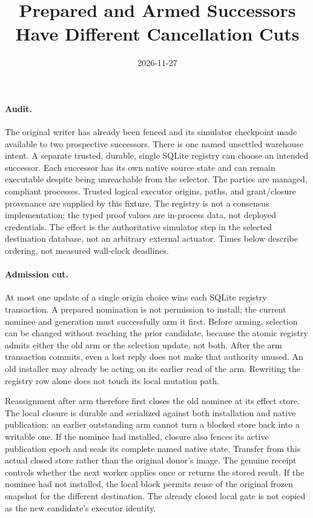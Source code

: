 \documentclass[11pt]{article}
\title{Prepared and Armed Successors Have Different Cancellation Cuts}
\date{2026-11-27}
\begin{document}
\maketitle

\paragraph{Audit.}
The original writer has already been fenced and its simulator
checkpoint made available to two prospective successors.
There is one named unsettled warehouse intent. A separate trusted,
durable, single SQLite registry can choose an intended successor.
Each successor has its own native source state and can remain
executable despite being unreachable from the selector. The parties
are managed, compliant processes. Trusted logical executor origins,
paths, and grant/closure provenance are supplied by this fixture.
The registry is not a consensus implementation; the typed proof
values are in-process data, not deployed credentials. The effect is
the authoritative simulator step in the selected destination
database, not an arbitrary external actuator. Times below describe
ordering, not measured wall-clock deadlines.

\paragraph{Admission cut.}
At most one update of a single origin choice wins each SQLite registry
transaction. A prepared nomination is not permission to install;
the current nominee and generation must successfully arm it first.
Before arming, selection can be changed without reaching the prior
candidate, because the atomic registry admits either the old arm
or the selection update, not both. After the arm transaction commits,
even a lost reply does not make that authority unused. An old installer
may already be acting on its earlier read of the arm. Rewriting the
registry row alone does not touch its local mutation path.

Reassignment after arm therefore first closes the old nominee at
its effect store. The local closure is durable and serialized against
both installation and native publication: an earlier outstanding arm
cannot turn a blocked store back into a writable one. If the nominee
had installed, closure also fences its active publication epoch
and seals its complete named native state. Transfer from this
actual closed store rather than the original donor's image.
The genuine receipt controls whether the next worker applies once or
returns the stored result. If the nominee had not installed,
the local block permits reuse of the original frozen snapshot for
the different destination. The already closed local gate is
not copied as the new candidate's executor identity.
\end{document}
